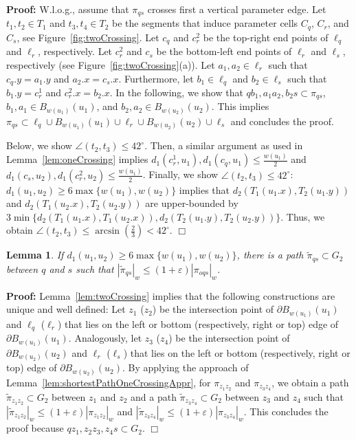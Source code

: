 \documentclass[a4paper,11pt]{article}
\newtheorem{lemma}{Lemma}
\newenvironment{proof}{\textbf{Proof:}}{\hspace*{0mm}\hfill\ensuremath{\Box}}
\begin{document}
\begin{proof}
	W.l.o.g., assume that $\pi_{qs}$ crosses first a vertical parameter edge. Let $t_1,t_2 \in T_1$ and $t_3,t_4 \in T_2$ be the segments that induce  parameter cells $C_q$, $C_r$, and $C_s$, see Figure~\ref{fig:twoCrossing}. Let $c_q$ and $c_r^2$ be the top-right end points of $\ell_q$ and $\ell_r$, respectively. Let  $c_r^2$ and $c_s$ be the bottom-left end points of $\ell_r$ and $\ell_s$, respectively (see Figure~\ref{fig:twoCrossing}(a)). Let $a_1,a_2 \in \ell_r$ such that $c_q.y = a_1.y$ and $a_2.x = c_s.x$. Furthermore, let $b_1 \in \ell_q$ and $b_2 \in \ell_s$ such that $b_1.y = c_r^1$ and $c_r^2.x = b_2.x$. In the following, we show that $qb_1, a_1a_2, b_2s \subset \pi_{qs}$, $b_1,a_1 \in B_{w(u_1)}(u_1)$, and $b_2,a_2 \in B_{w(u_2)}(u_2)$. This implies $\pi_{qs} \subset \ell_{q} \cup B_{w(u_1)}(u_1) \cup \ell_{r} \cup B_{w(u_2)}(u_2) \cup \ell_s$ and concludes the proof.
	
	
	Below, we show $\angle (t_2,t_3) \leq 42^{\circ}$. Then, a similar argument as used in Lemma~\ref{lem:oneCrossing} implies $d_1(c_r^1,u_1),d_1(c_q,u_1) \leq \frac{w(u_1)}{2}$ and $d_1(c_s,u_2),d_1(c_r^2,u_2) \leq \frac{w(u_1)}{2}$.
	Finally, we show $\angle (t_2,t_3) \leq 42^{\circ}$: $d_1(u_1,u_2) \geq 6 \max \{ w(u_1), w(u_2) \}$ implies that $d_2(T_1(u_1.x),T_2(u_1.y))$ and $ d_2(T_1(u_2.x),T_2(u_2.y))$ are upper-bounded by $3 \min \{ d_2(T_1(u_1.x), T_1(u_2.x)), d_2(T_2(u_1.y), T_2(u_2.y)) \}$. Thus, we obtain $\angle (t_2,t_3) \leq \arcsin (\frac{2}{3}) < 42^{\circ}$.
\end{proof}

\begin{lemma}\label{lem:shortestPathTwoCrossingApprSimplie}
	If $d_1(u_1,u_2) \geq 6 \max \{ w(u_1), w(u_2) \}$, there is a path $\widetilde{\pi}_{qs} \subset G_2$ between $q$ and $s$ such that $|\widetilde{\pi}_{qs}|_w \leq (1+\varepsilon) |\pi_{oqs}|_w$.
\end{lemma}
\begin{proof}
	Lemma~\ref{lem:twoCrossing} implies that the following constructions are unique and well defined: Let $z_1$ ($z_2$) be the intersection point of $\partial B_{w(u_1)}(u_1)$ and $\ell_q$ ($\ell_r$) that lies on the left or bottom (respectively, right or top) edge of $\partial B_{w(u_1)}(u_1)$. Analogously, let $z_3$ ($z_4$) be the intersection point of $\partial B_{w(u_2)}(u_2)$ and $\ell_r$ ($\ell_s$) that lies on the left or bottom (respectively, right or top) edge of $\partial B_{w(u_2)}(u_2)$.  
	 By applying the approach of Lemma~\ref{lem:shortestPathOneCrossingAppr}, for $\pi_{z_1z_2}$ and $\pi_{z_3z_4}$, we obtain a path $\widetilde{\pi}_{z_1z_2} \subset G_2$ between $z_1$ and $z_2$ and a path $\widetilde{\pi}_{z_3z_4} \subset G_2$ between $z_3$ and $z_4$ such that $|\widetilde{\pi}_{z_1z_2}|_w \leq (1 + \varepsilon) |\pi_{z_1z_2}|_w$ and $|\widetilde{\pi}_{z_3z_4}|_w \leq (1 + \varepsilon) |\pi_{z_3z_4}|_w$.
	This concludes the proof because $qz_1, z_2z_3, z_4s \subset G_2$.
\end{proof}
\end{document}
